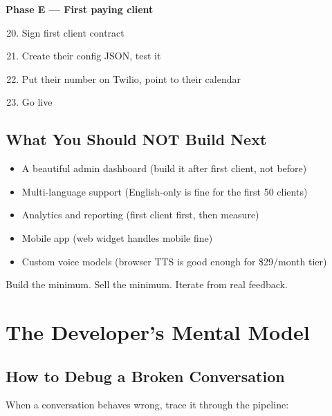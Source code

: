 \documentclass[12pt, a4paper]{report}
\begin{document}
\textbf{Phase E --- First paying client}
\begin{enumerate}
  \setcounter{enumi}{19}
  \item Sign first client contract
  \item Create their config JSON, test it
  \item Put their number on Twilio, point to their calendar
  \item Go live
\end{enumerate}

\section{What You Should NOT Build Next}

\begin{itemize}
  \item A beautiful admin dashboard (build it after first client, not before)
  \item Multi-language support (English-only is fine for the first 50 clients)
  \item Analytics and reporting (first client first, then measure)
  \item Mobile app (web widget handles mobile fine)
  \item Custom voice models (browser TTS is good enough for \$29/month tier)
\end{itemize}

\begin{infobox}
  Build the minimum. Sell the minimum. Iterate from real feedback.
\end{infobox}

\chapter{The Developer's Mental Model}

\section{How to Debug a Broken Conversation}

When a conversation behaves wrong, trace it through the pipeline:
\end{document}

